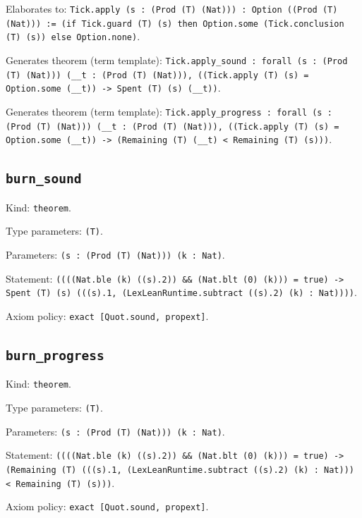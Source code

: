 \documentclass[11pt]{article}
\begin{document}
\noindent Elaborates to: \texttt{Tick.apply (s : (Prod (T) (Nat))) : Option ((Prod (T) (Nat))) := (if Tick.guard (T) (s) then Option.some (Tick.conclusion (T) (s)) else Option.none)}.\par
\noindent Generates theorem (term template): \texttt{Tick.apply\_sound : forall (s : (Prod (T) (Nat))) (\_\_t : (Prod (T) (Nat))), ((Tick.apply (T) (s) = Option.some (\_\_t)) -> Spent (T) (s) (\_\_t))}.\par
\noindent Generates theorem (term template): \texttt{Tick.apply\_progress : forall (s : (Prod (T) (Nat))) (\_\_t : (Prod (T) (Nat))), ((Tick.apply (T) (s) = Option.some (\_\_t)) -> (Remaining (T) (\_\_t) < Remaining (T) (s)))}.\par
\subsection*{\texttt{burn\_sound}}
\noindent Kind: \texttt{theorem}.\par
\noindent Type parameters: \texttt{(T)}.\par
\noindent Parameters: \texttt{(s : (Prod (T) (Nat))) (k : Nat)}.\par
\noindent Statement: \texttt{((((Nat.ble (k) ((s).2)) \&\& (Nat.blt (0) (k))) = true) -> Spent (T) (s) (((s).1, (LexLeanRuntime.subtract ((s).2) (k) : Nat))))}.\par
\noindent Axiom policy: \texttt{exact [Quot.sound, propext]}.\par
\subsection*{\texttt{burn\_progress}}
\noindent Kind: \texttt{theorem}.\par
\noindent Type parameters: \texttt{(T)}.\par
\noindent Parameters: \texttt{(s : (Prod (T) (Nat))) (k : Nat)}.\par
\noindent Statement: \texttt{((((Nat.ble (k) ((s).2)) \&\& (Nat.blt (0) (k))) = true) -> (Remaining (T) (((s).1, (LexLeanRuntime.subtract ((s).2) (k) : Nat))) < Remaining (T) (s)))}.\par
\noindent Axiom policy: \texttt{exact [Quot.sound, propext]}.\par
\end{document}
